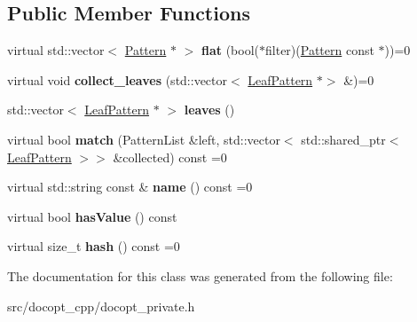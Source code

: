 \subsection*{Public Member Functions}
\begin{DoxyCompactItemize}
\item 
\mbox{\label{classdocopt_1_1Pattern_a0a235229a02694f2127df05a890dec94}} 
virtual std\+::vector$<$ \hyperlink{classdocopt_1_1Pattern}{Pattern} $\ast$ $>$ {\bfseries flat} (bool($\ast$filter)(\hyperlink{classdocopt_1_1Pattern}{Pattern} const $\ast$))=0
\item 
\mbox{\label{classdocopt_1_1Pattern_a6a16e61f7fc1634ff90b23aaf4336e2f}} 
virtual void {\bfseries collect\+\_\+leaves} (std\+::vector$<$ \hyperlink{classdocopt_1_1LeafPattern}{Leaf\+Pattern} $\ast$$>$ \&)=0
\item 
\mbox{\label{classdocopt_1_1Pattern_ae85dc8111e7786da5f19077d803683cb}} 
std\+::vector$<$ \hyperlink{classdocopt_1_1LeafPattern}{Leaf\+Pattern} $\ast$ $>$ {\bfseries leaves} ()
\item 
\mbox{\label{classdocopt_1_1Pattern_abc6c22c0858f5a02be93530dc5e5c340}} 
virtual bool {\bfseries match} (Pattern\+List \&left, std\+::vector$<$ std\+::shared\+\_\+ptr$<$ \hyperlink{classdocopt_1_1LeafPattern}{Leaf\+Pattern} $>$$>$ \&collected) const =0
\item 
\mbox{\label{classdocopt_1_1Pattern_a2334b803066089f752f75dfb8b6e6791}} 
virtual std\+::string const  \& {\bfseries name} () const =0
\item 
\mbox{\label{classdocopt_1_1Pattern_a952fcee01661ea94019fdcbe168005a7}} 
virtual bool {\bfseries has\+Value} () const
\item 
\mbox{\label{classdocopt_1_1Pattern_a4fdb3144b57b5a9350529c42878f1578}} 
virtual size\+\_\+t {\bfseries hash} () const =0
\end{DoxyCompactItemize}


The documentation for this class was generated from the following file\+:\begin{DoxyCompactItemize}
\item 
src/docopt\+\_\+cpp/docopt\+\_\+private.\+h\end{DoxyCompactItemize}

